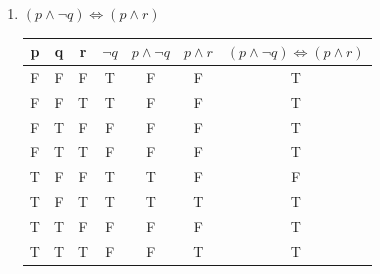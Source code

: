 \documentclass[fleqn, 12pt]{article}
\theoremstyle{definition}
\begin{document}
\begin{enumerate}
\item $(p \land \neg q) \Leftrightarrow (p \land r)$
\begin{table}[htp]
  \begin{center}
    \begin{tabular}{|c|c|c|c|c|c|c|} 
\hline
      p & q  &  r & $ \neg q$ & $p \land \neg q$ & $p \land r$ & $(p \land \neg q) \Leftrightarrow (p \land r)$\\
      \hline
	F & F & F & T & F & F & T\\
\hline
	F & F & T & T & F & F & T\\
\hline
	F & T & F  & F & F & F & T\\
\hline
 	F & T & T  & F & F & F & T\\
\hline
	T & F & F & T & T & F & F\\
\hline
	T & F & T & T & T & T & T\\
\hline
	T & T & F  & F & F & F & T\\
\hline
 	T & T & T  & F & F & T & T\\
\hline
    \end{tabular}
  \end{center}
\end{table}
\end{enumerate}
\end{document}
